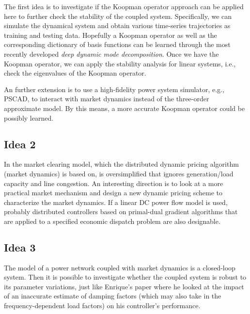 \documentclass[journal,12pt,onecolumn,draftclsnofoot]{IEEEtran}
\begin{document}
The first idea is to investigate if the Koopman operator approach can be applied here to further check the stability of the coupled system. Specifically, we can simulate the dynamical system and obtain various time-series trajectories as training and testing data. Hopefully a Koopman operator as well as the corresponding dictionary of basis functions can be learned through the most recently developed \emph{deep dynamic mode decomposition}. Once we have the Koopman operator, we can apply the stability analysis for linear systems, i.e., check the eigenvalues of the Koopman operator. 


An further extension is to use a high-fidelity power system simulator, e.g., PSCAD, to interact with market dynamics instead of the three-order approximate model. By this means, a more accurate Koopman operator could be possibly learned.  


\subsection{Idea 2}

In \cite{stegink2016stabilization} the market clearing model, which the distributed dynamic pricing algorithm (market dynamics) is based on, is oversimplified that ignores generation/load capacity and line congestion. An interesting direction is to look at a more practical market mechanism and design a new dynamic pricing scheme to characterize the market dynamics. If a linear DC power flow model is used, probably distributed controllers based on primal-dual gradient algorithms that are applied to a specified economic dispatch problem are also designable. 

\subsection{Idea 3}

The model of a power network coupled with market dynamics is a closed-loop system. Then it is possible to investigate whether the coupled system is robust to its parameter variations, just like Enrique's paper where he looked at the impact of an inaccurate estimate of damping factors (which may also take in the frequency-dependent load factors) on his controller's performance. 
\end{document}

